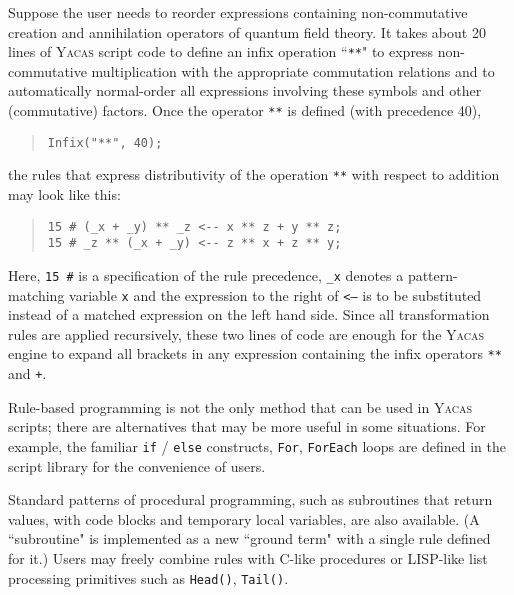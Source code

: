 \documentclass{llncs}
\begin{document}
Suppose the user needs to reorder expressions containing non-commutative creation and
annihilation operators of quantum field theory. It takes about 20 lines of
\textsc{Yacas} script code to define an infix operation ``\small{\texttt{**}}" to express non-commutative
multiplication with the appropriate commutation relations and to automatically
normal-order all expressions involving these symbols and other (commutative)
factors. Once the operator \small{\texttt{**}} is defined (with precedence 40),
\begin{quote}\small\begin{verbatim}
Infix("**", 40);
\end{verbatim}\end{quote}
the rules that express distributivity of the operation \small{\texttt{**}} with
respect to addition may look like this:
\begin{quote}\small\begin{verbatim}
15 # (_x + _y) ** _z <-- x ** z + y ** z;
15 # _z ** (_x + _y) <-- z ** x + z ** y;
\end{verbatim}\end{quote}
Here, \small{\texttt{15 \#}} is a specification of the rule precedence, \small{\texttt{\_x}} denotes a
pattern-matching variable \small{\texttt{x}} and the expression to the right of \small{\texttt{<--}} is to be
substituted instead of a matched expression on the left hand side. Since all
transformation rules are applied recursively, these two lines of code are enough for the \textsc{Yacas}
engine to expand all brackets in any expression containing the infix operators
\small{\texttt{**}} and \small{\texttt{+}}.

Rule-based programming is not the only method that can be used in \textsc{Yacas} scripts;
there are alternatives that may be more useful in some situations. For example,
the familiar \small{\texttt{if}} / \small{\texttt{else}} constructs, \small{\texttt{For}}, \small{\texttt{ForEach}} loops are
defined in the script library for the convenience of users.

Standard patterns of procedural programming, such as subroutines that
return values, with code blocks and temporary local variables, are also
available. (A ``subroutine" is implemented as a new ``ground term" with a single
rule defined for it.) Users may freely combine rules with C-like
procedures or LISP-like list processing primitives such as \small{\texttt{Head()}},
\small{\texttt{Tail()}}.
\end{document}
